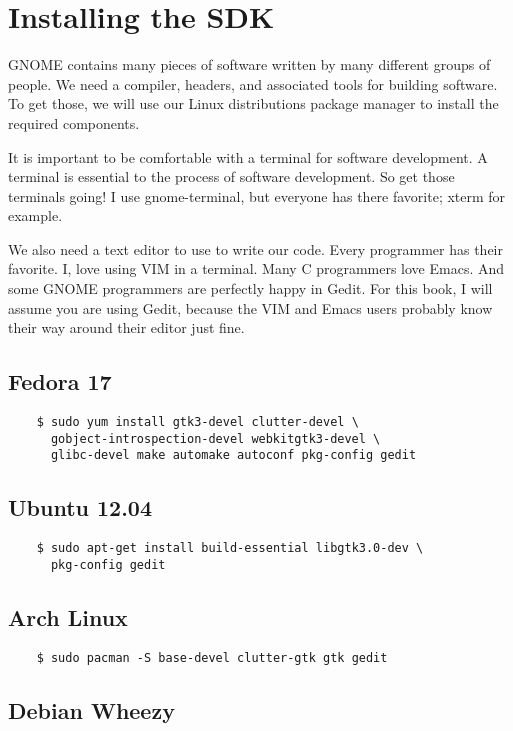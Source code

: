 \section{Installing the SDK}

GNOME contains many pieces of software written by many different groups of
people. We need a compiler, headers, and associated tools for building
software. To get those, we will use our Linux distributions package manager to
install the required components.

It is important to be comfortable with a terminal for software development. A
terminal is essential to the process of software development. So get those
terminals going! I use gnome-terminal, but everyone has there favorite; xterm
for example.

We also need a text editor to use to write our code. Every programmer has their
favorite. I, love using VIM in a terminal. Many C programmers love Emacs. And
some GNOME programmers are perfectly happy in Gedit. For this book, I will
assume you are using Gedit, because the VIM and Emacs users probably know their
way around their editor just fine.


\subsection{Fedora 17}

\begin{Verbatim}
    $ sudo yum install gtk3-devel clutter-devel \
      gobject-introspection-devel webkitgtk3-devel \
      glibc-devel make automake autoconf pkg-config gedit
\end{Verbatim}


\subsection{Ubuntu 12.04}

\begin{Verbatim}
    $ sudo apt-get install build-essential libgtk3.0-dev \
      pkg-config gedit
\end{Verbatim}


\subsection{Arch Linux}
\begin{Verbatim}
    $ sudo pacman -S base-devel clutter-gtk gtk gedit
\end{Verbatim}

\subsection{Debian Wheezy}

